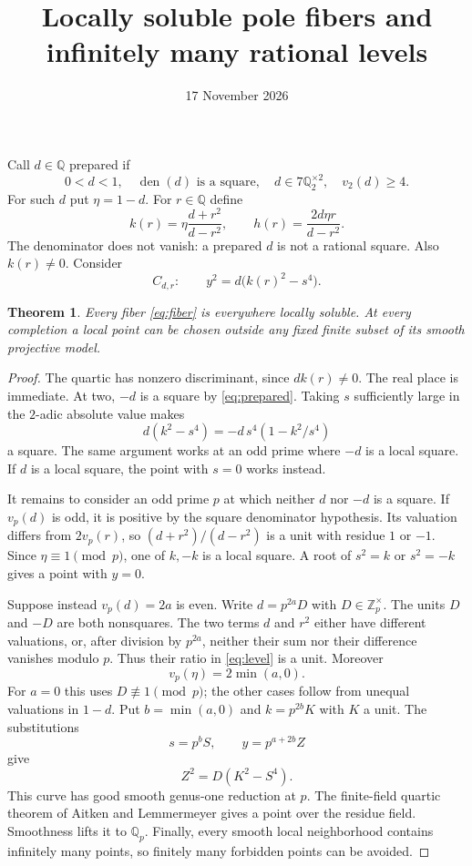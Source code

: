 \documentclass[11pt,a4paper]{article}
\title{Locally soluble pole fibers and infinitely many rational levels}
\author{}\date{17 November 2026}
\newtheorem{theorem}{Theorem}
\newcommand{\Q}{\mathbb Q}
\begin{document}
\maketitle

Call $d\in\Q$ prepared if
\begin{equation}\label{eq:prepared}
0<d<1,\quad \operatorname{den}(d)\text{ is a square},\quad
d\in7\Q_2^{\times2},\quad v_2(d)\ge4.
\end{equation}
For such $d$ put $\eta=1-d$. For $r\in\Q$ define
\begin{equation}\label{eq:level}
k(r)=\eta\frac{d+r^2}{d-r^2},\qquad
h(r)=\frac{2d\eta r}{d-r^2}.
\end{equation}
The denominator does not vanish: a prepared $d$ is not a rational
square. Also $k(r)\ne0$. Consider
\begin{equation}\label{eq:fiber}
C_{d,r}:\qquad y^2=d\bigl(k(r)^2-s^4\bigr).
\end{equation}

\begin{theorem}\label{thm:local}
Every fiber \eqref{eq:fiber} is everywhere locally soluble.
At every completion a local point can be chosen outside any fixed
finite subset of its smooth projective model.
\end{theorem}
\begin{proof}
The quartic has nonzero discriminant, since $dk(r)\ne0$.
The real place is immediate. At two, $-d$ is a square by
\eqref{eq:prepared}. Taking $s$ sufficiently large in the $2$-adic
absolute value makes
\[
d(k^2-s^4)=-d\,s^4(1-k^2/s^4)
\]
a square. The same argument works at an odd prime where $-d$ is
a local square. If $d$ is a local square, the point with $s=0$
works instead.

It remains to consider an odd prime $p$ at which neither $d$ nor
$-d$ is a square. If $v_p(d)$ is odd, it is positive by the square
denominator hypothesis. Its valuation differs from $2v_p(r)$, so
$(d+r^2)/(d-r^2)$ is a unit with residue $1$ or $-1$. Since
$\eta\equiv1\pmod p$, one of $k,-k$ is a local square. A root
of $s^2=k$ or $s^2=-k$ gives a point with $y=0$.

Suppose instead $v_p(d)=2a$ is even. Write $d=p^{2a}D$ with
$D\in\mathbb Z_p^\times$. The units $D$ and $-D$ are both
nonsquares. The two terms $d$ and $r^2$ either have different
valuations, or, after division by $p^{2a}$, neither their sum nor
their difference vanishes modulo $p$. Thus their ratio in
\eqref{eq:level} is a unit. Moreover
\[
v_p(\eta)=2\min(a,0).
\]
For $a=0$ this uses $D\not\equiv1\pmod p$; the other cases
follow from unequal valuations in $1-d$. Put $b=\min(a,0)$ and
$k=p^{2b}K$ with $K$ a unit. The substitutions
\[
s=p^bS,\qquad y=p^{a+2b}Z
\]
give
\[
Z^2=D(K^2-S^4).
\]
This curve has good smooth genus-one reduction at $p$. The finite-field quartic theorem of Aitken and Lemmermeyer
\cite[Theorem 6]{AL} gives a point over the residue field.
Smoothness lifts it to $\Q_p$. Finally, every smooth local neighborhood contains
infinitely many points, so finitely many forbidden points can be
avoided.
\end{proof}
\end{document}
